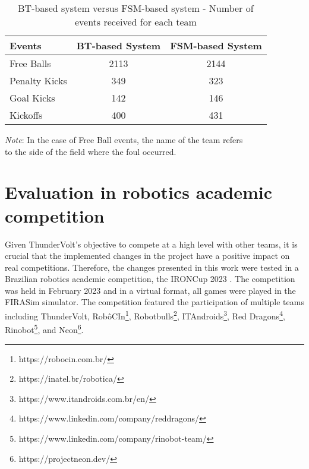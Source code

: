 \begin{table}[h]
    \begin{minipage}{\columnwidth}
        \centering
        \begin{tabular}{l c c}
            \toprule
            Events        & BT-based System & FSM-based System \\
            \midrule
            Free Balls    & 2113            & 2144             \\
            Penalty Kicks & 349             & 323              \\
            Goal Kicks    & 142             & 146              \\
            Kickoffs      & 400             & 431              \\
            \bottomrule
        \end{tabular}
        \begin{center}
            \footnotesize
            \emph{Note}: In the case of Free Ball events, the name of the team refers \\ 
            to the side of the field where the foul occurred.
        \end{center}
    \end{minipage}
    \caption{BT-based system versus FSM-based system - Number of events received for each team}
    \label{tab:fouls_count}
\end{table}

\section{Evaluation in robotics academic competition}

Given ThunderVolt's objective to compete at a high level with other teams, it is crucial that the implemented changes in the project have a positive impact on real competitions. Therefore, the changes presented in this work were tested in a Brazilian robotics academic competition, the IRONCup 2023 \cite{IRONCup2023}. The competition was held in February 2023 and in a virtual format, all games were played in the FIRASim simulator. The competition featured the participation of multiple teams including ThunderVolt, RobôCIn\footnote{https://robocin.com.br/}, Robotbulls\footnote{https://inatel.br/robotica/}, ITAndroids\footnote{https://www.itandroids.com.br/en/}, Red Dragons\footnote{https://www.linkedin.com/company/reddragons/}, Rinobot\footnote{https://www.linkedin.com/company/rinobot-team/}, and Neon\footnote{https://projectneon.dev/}.

